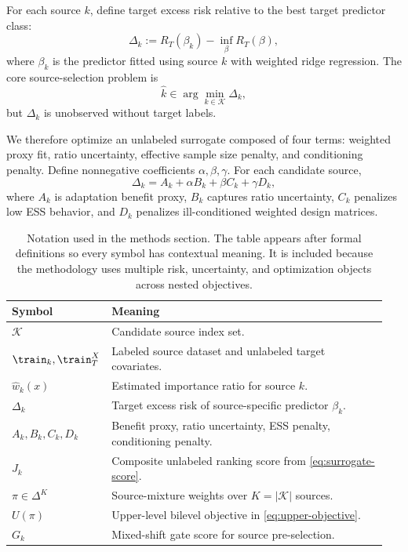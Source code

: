 \documentclass{article} %
\begin{document}
For each source \(k\), define target excess risk relative to the best target predictor class:
\begin{equation}
\Delta_k := R_T(\beta_k)-\inf_{\beta}R_T(\beta),
\label{eq:delta-def}
\end{equation}
where \(\beta_k\) is the predictor fitted using source \(k\) with weighted ridge regression. The core source-selection problem is
\begin{equation}
\hat k\in \arg\min_{k\in\mathcal{K}} \Delta_k,
\label{eq:source-selection-ideal}
\end{equation}
but \(\Delta_k\) is unobserved without target labels.

We therefore optimize an unlabeled surrogate composed of four terms: weighted proxy fit, ratio uncertainty, effective sample size penalty, and conditioning penalty. Define nonnegative coefficients \(\alpha,\beta,\gamma\). For each candidate source,
\begin{equation}
\Delta_k = A_k + \alpha B_k + \beta C_k + \gamma D_k,
\label{eq:decomposition}
\end{equation}
where \(A_k\) is adaptation benefit proxy, \(B_k\) captures ratio uncertainty, \(C_k\) penalizes low ESS behavior, and \(D_k\) penalizes ill-conditioned weighted design matrices.

\begin{table}[t]
\caption{Notation used in the methods section. The table appears after formal definitions so every symbol has contextual meaning. It is included because the methodology uses multiple risk, uncertainty, and optimization objects across nested objectives.}
\label{tab:notation}
\centering
\small
\renewcommand{\arraystretch}{1.1}
\setlength{\tabcolsep}{4pt}
\begin{tabular}{p{0.2\linewidth}p{0.75\linewidth}}
\hline
Symbol & Meaning \\
\hline
\(\mathcal{K}\) & Candidate source index set. \\
\(\train_k,\train_T^X\) & Labeled source dataset and unlabeled target covariates. \\
\(\hat w_k(x)\) & Estimated importance ratio for source \(k\). \\
\(\Delta_k\) & Target excess risk of source-specific predictor \(\beta_k\). \\
\(A_k,B_k,C_k,D_k\) & Benefit proxy, ratio uncertainty, ESS penalty, conditioning penalty. \\
\(J_k\) & Composite unlabeled ranking score from \eqref{eq:surrogate-score}. \\
\(\pi\in\Delta^{K}\) & Source-mixture weights over \(K=|\mathcal{K}|\) sources. \\
\(U(\pi)\) & Upper-level bilevel objective in \eqref{eq:upper-objective}. \\
\(G_k\) & Mixed-shift gate score for source pre-selection. \\
\hline
\end{tabular}
\end{table}
\end{document}
